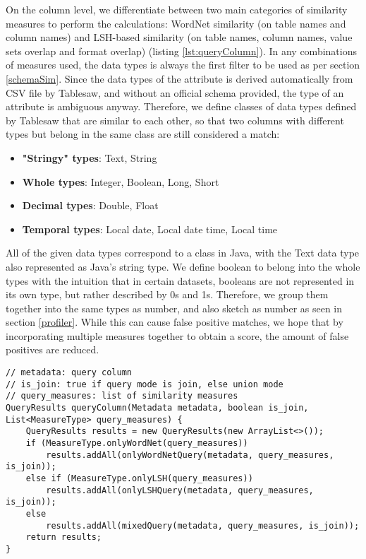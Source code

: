 On the column level, we differentiate between two main categories of similarity measures to perform the calculations: WordNet similarity (on table names and column names) and LSH-based similarity (on table names, column names, value sets overlap and format overlap) (listing \ref{lst:queryColumn}). In any combinations of measures used, the data types is always the first filter to be used as per section \ref{schemaSim}. Since the data types of the attribute is derived automatically from CSV file by Tablesaw, and without an official schema provided, the type of an attribute is ambiguous anyway. Therefore, we define classes of data types defined by Tablesaw that are similar to each other, so that two columns with different types but belong in the same class are still considered a match:

\begin{itemize}
    \item \textbf{"Stringy" types}: Text, String
    \item \textbf{Whole types}: Integer, Boolean, Long, Short
    \item \textbf{Decimal types}: Double, Float
    \item \textbf{Temporal types}: Local date, Local date time, Local time
\end{itemize}

All of the given data types correspond to a class in Java, with the Text data type also represented as Java's string type. We define boolean to belong into the whole types with the intuition that in certain datasets, booleans are not represented in its own type, but rather described by 0s and 1s. Therefore, we group them together into the same types as number, and also sketch as number as seen in section \ref{profiler}. While this can cause false positive matches, we hope that by incorporating multiple measures together to obtain a score, the amount of false positives are reduced.

\begin{lstlisting}[caption=Overview of the queryColumn() method, label=lst:queryColumn]
// metadata: query column
// is_join: true if query mode is join, else union mode
// query_measures: list of similarity measures
QueryResults queryColumn(Metadata metadata, boolean is_join, List<MeasureType> query_measures) {
    QueryResults results = new QueryResults(new ArrayList<>());
    if (MeasureType.onlyWordNet(query_measures))
        results.addAll(onlyWordNetQuery(metadata, query_measures, is_join));
    else if (MeasureType.onlyLSH(query_measures))
        results.addAll(onlyLSHQuery(metadata, query_measures, is_join));
    else
        results.addAll(mixedQuery(metadata, query_measures, is_join));
    return results;
}
\end{lstlisting}

